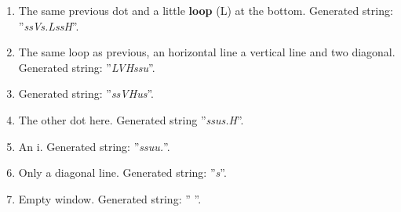 \begin{enumerate}[label=(\alph*)]
\begin{figure}[H]
\end{figure} 
\item The same previous dot and a little \textbf{loop} (L) at the bottom. Generated string: ''\emph{ssVs.LssH}''.
\begin{figure}[H]
\centering
{}
\end{figure} 
\item The same loop as previous, an horizontal line a vertical line and two diagonal. Generated string: ''\emph{LVHssu}''.
\begin{figure}[H]
\centering
{}
\end{figure} 
\item Generated string: ''\emph{ssVHus}''.
\begin{figure}[H]
\centering
{}
\end{figure} 
\item The other dot here. Generated string ''\emph{ssus.H}''.
\begin{figure}[H]
\centering
{}
\end{figure} 
\item An i. Generated string: ''\emph{ssuu.}''.
\begin{figure}[H]
\centering
{}
\end{figure} 
\item Only a diagonal line. Generated string: ''\emph{s}''.
\begin{figure}[H]
\centering
{}
\end{figure} 
\item Empty window. Generated string: ''\emph{ }''.
\begin{figure}[H]
\centering
{}
\end{figure} 
\end{enumerate}
